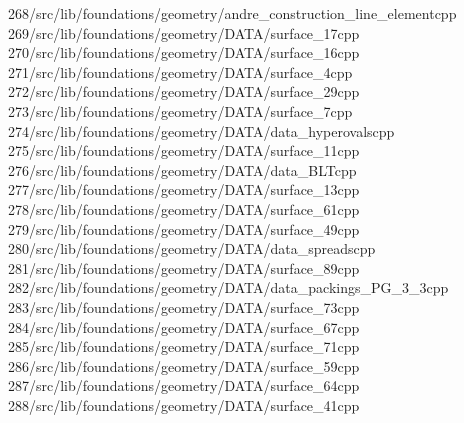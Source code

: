 \begin{tabbing}
268\>/src/lib/foundations/geometry/andre\_construction\_line\_elementcpp\\[0pt]
269\>/src/lib/foundations/geometry/DATA/surface\_17cpp\\[0pt]
270\>/src/lib/foundations/geometry/DATA/surface\_16cpp\\[0pt]
271\>/src/lib/foundations/geometry/DATA/surface\_4cpp\\[0pt]
272\>/src/lib/foundations/geometry/DATA/surface\_29cpp\\[0pt]
273\>/src/lib/foundations/geometry/DATA/surface\_7cpp\\[0pt]
274\>/src/lib/foundations/geometry/DATA/data\_hyperovalscpp\\[0pt]
275\>/src/lib/foundations/geometry/DATA/surface\_11cpp\\[0pt]
276\>/src/lib/foundations/geometry/DATA/data\_BLTcpp\\[0pt]
277\>/src/lib/foundations/geometry/DATA/surface\_13cpp\\[0pt]
278\>/src/lib/foundations/geometry/DATA/surface\_61cpp\\[0pt]
279\>/src/lib/foundations/geometry/DATA/surface\_49cpp\\[0pt]
280\>/src/lib/foundations/geometry/DATA/data\_spreadscpp\\[0pt]
281\>/src/lib/foundations/geometry/DATA/surface\_89cpp\\[0pt]
282\>/src/lib/foundations/geometry/DATA/data\_packings\_PG\_3\_3cpp\\[0pt]
283\>/src/lib/foundations/geometry/DATA/surface\_73cpp\\[0pt]
284\>/src/lib/foundations/geometry/DATA/surface\_67cpp\\[0pt]
285\>/src/lib/foundations/geometry/DATA/surface\_71cpp\\[0pt]
286\>/src/lib/foundations/geometry/DATA/surface\_59cpp\\[0pt]
287\>/src/lib/foundations/geometry/DATA/surface\_64cpp\\[0pt]
288\>/src/lib/foundations/geometry/DATA/surface\_41cpp\\[0pt]

\end{tabbing}
